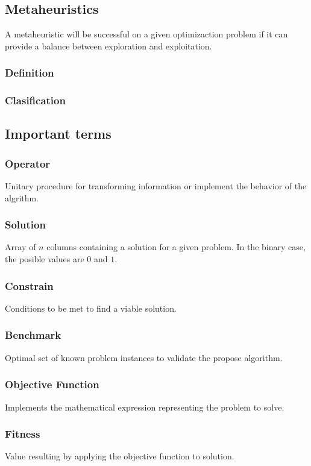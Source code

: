 \subsection{Metaheuristics}
A metaheuristic will be successful on a given optimizaction problem if it can provide a balance between exploration and exploitation. 
\subsubsection{Definition}
\subsubsection{Clasification}
\subsection{Important terms}
\subsubsection{Operator} 
Unitary procedure for transforming information or implement the behavior of the algrithm.

\subsubsection{Solution} 
Array of $n$ columns containing a solution for a given problem. In the binary case, the posible values are $0$ and $1$.

\subsubsection{Constrain} 
Conditions to be met to find a viable solution.

\subsubsection{Benchmark} 
Optimal set of known problem instances to validate the propose algorithm.

\subsubsection{Objective Function}  
Implements the mathematical expression representing the problem to solve.

\subsubsection{Fitness} 
Value resulting by applying the objective function to solution.

